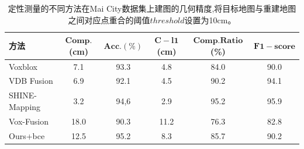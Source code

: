 \begin{table}[htbp]
    \centering
    \caption{定性测量的不同方法在Mai City数据集上建图的几何精度,将目标地图与重建地图之间对应点重合的阈值$threshold$设置为10cm。}\label{maicitymetric}
    \begin{tabular}[htbp]{llccccc}
        \toprule
        \multicolumn{2}{l}{方法} & $\mathbf{Comp.}$(cm) & $\mathbf{Acc.}(\%)$ & $\mathbf{C-l1}$(cm) &  $\mathbf{Comp. Ratio}$(\%) &$\mathbf{F1-score}$\\
        \midrule
        \multicolumn{2}{l}{Voxblox} & 7.1 & 93.3 & 4.8 &84.0&90.0\\
        \multicolumn{2}{l}{VDB Fusion} & 6.9&92.1&4.5&90.2&94.1 \\
        \multicolumn{2}{l}{SHINE-Mapping} & 3.2&94,6&2.9&95.2&95.9 \\
        \multicolumn{2}{l}{Vox-Fusion} & 18.0 & 90.3 &11.2&76.3&82.8\\
        \midrule
        \multicolumn{2}{l}{Ours+bce} & 12.5&95.2 &8.3&85.7&90.2\\
        \bottomrule
    \end{tabular}
\end{table}
